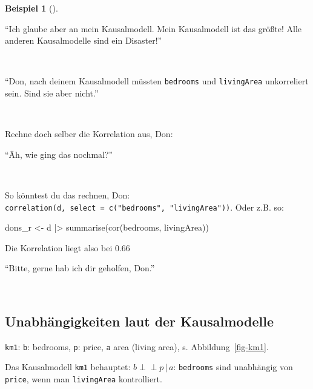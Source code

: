 \documentclass[
  ngerman,
  letterpaper,
  twoside,
  open=any]{scrbook}
\newenvironment{Shaded}{\begin{snugshade}}{\end{snugshade}}
\newcommand{\FunctionTok}[1]{\textcolor[rgb]{0.28,0.35,0.67}{#1}}
\newcommand{\NormalTok}[1]{\textcolor[rgb]{0.00,0.23,0.31}{#1}}
\newcommand{\OtherTok}[1]{\textcolor[rgb]{0.00,0.23,0.31}{#1}}
\newcommand{\SpecialCharTok}[1]{\textcolor[rgb]{0.37,0.37,0.37}{#1}}
\theoremstyle{definition}
\newtheorem{example}{Beispiel}[chapter]
\theoremstyle{plain}
\theoremstyle{definition}
\theoremstyle{definition}
\theoremstyle{remark}
\begin{document}
\begin{example}[]
\begin{figure}[H]
\end{figure}%

\begin{displayquote}
\enquote{Ich glaube aber an mein Kausalmodell. Mein Kausalmodell ist das
größte! Alle anderen Kausalmodelle sind ein Disaster!}
\end{displayquote}

🧑

\begin{displayquote}
\enquote{Don, nach deinem Kausalmodell müssten \texttt{bedrooms} und
\texttt{livingArea} unkorreliert sein. Sind sie aber nicht.}
\end{displayquote}

🧑

Rechne doch selber die Korrelation aus, Don:

\begin{displayquote}
\enquote{Äh, wie ging das nochmal?}
\end{displayquote}

🧑

So könntest du das rechnen, Don:
\texttt{correlation(d,\ select\ =\ c("bedrooms",\ "livingArea"))}. Oder
z.B. so:

\begin{Shaded}
\begin{Highlighting}[]
\NormalTok{dons\_r }\OtherTok{\textless{}{-}}\NormalTok{ d }\SpecialCharTok{|\textgreater{}} 
  \FunctionTok{summarise}\NormalTok{(}\FunctionTok{cor}\NormalTok{(bedrooms, livingArea))}
\end{Highlighting}
\end{Shaded}

Die Korrelation liegt also bei 0.66

\begin{displayquote}
\enquote{Bitte, gerne hab ich dir geholfen, Don.}
\end{displayquote}

👩

\subsection{Unabhängigkeiten laut der
Kausalmodelle}\label{unabhuxe4ngigkeiten-laut-der-kausalmodelle}

\texttt{km1}: \texttt{b}: bedrooms, \texttt{p}: price, \texttt{a} area
(living area), s. Abbildung~\ref{fig-km1}.

Das Kausalmodell \texttt{km1} behauptet:
\(b \perp \!\!\! \perp p \, |\, a\): \texttt{bedrooms} sind unabhängig
von \texttt{price}, wenn man \texttt{livingArea} kontrolliert.


\end{example}
\end{document}
